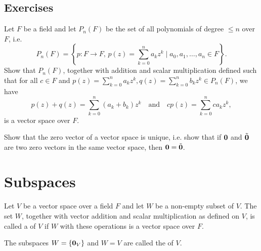 \subsection*{Exercises}

\begin{exer}\label{exer:pnvs}
Let $ F $ be a field and let $ P_n(F) $ be the set of all polynomials of degree $ \leq n $ over $ F $, i.e.
\begin{equation*}
    P_n(F)=\left\{p:F\to F,\,p(z)=\sum_{k=0}^n a_k z^k\mid a_0,a_1,\ldots,a_n\in F\right\}.
\end{equation*}
Show that $ P_n(F) $, together with addition and scalar multiplication defined such that for all $ c\in F $ and $ p(z)=\sum_{k=0}^n a_k z^k,q(z)=\sum_{k=0}^n b_k z^k\in P_n(F) $, we have
\begin{equation*}
    p(z)+q(z)=\sum_{k=0}^n (a_k+b_k)z^k \quad\text{and}\quad cp(z)=\sum_{k=0}^n ca_k z^k,
\end{equation*}
is a vector space over $ F $.
\end{exer}

\begin{exer}\label{exer:0unique}
Show that the zero vector of a vector space is unique, i.e. show that if $ \mathbf{0} $ and $ \tilde{\mathbf{0}} $ are two zero vectors in the same vector space, then $ \mathbf{0}=\tilde{\mathbf{0}} $.
\end{exer}

\section{Subspaces}

\begin{defn}
Let $ V $ be a vector space over a field $ F $ and let $ W $ be a non-empty subset of $ V $. The set $ W $, together with vector addition and scalar multiplication as defined on $ V $, is called a  of $ V $ if $ W $ with these operations is a vector space over $ F $.

The subspaces $ W=\{\mathbf{0}_V\} $ and $ W=V $ are called the  of $ V $.
\end{defn}

